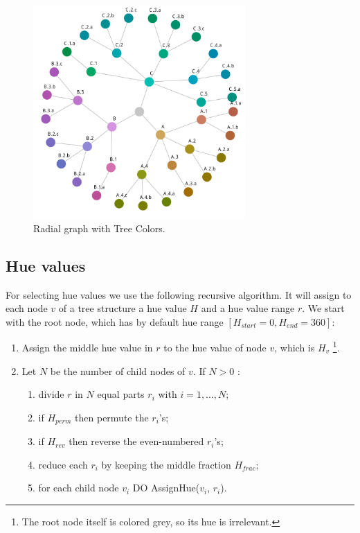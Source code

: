 \documentclass[journal]{vgtc}                %
\begin{document}
\begin{figure}[tb]

  \centering
  \includegraphics[width=3.2in]{HCPgraph.pdf}
  \caption{Radial graph with Tree Colors.}\label{fig:graph}

\end{figure}

\subsection{Hue values}

For selecting hue values we use the following recursive algorithm. It will assign to each node $v$ of a tree structure a hue value $H$ and a hue value range $r$.
We start with the root node, which has by default hue range $[H_{start}=0, H_{end}=360]$:

\begin{enumerate} \itemsep1pt \parskip0pt 
\item Assign the middle hue value in $r$ to the hue value of node $v$, which is $H_v$ \footnote{The root node itself is colored grey, so its hue is irrelevant.}.
\item Let $N$ be the number of child nodes of $v$. If $N>0$ :
\begin{enumerate}[i] \itemsep1pt \parskip0pt 
\item divide $r$ in $N$ equal parts $r_i$ with $i=1,\ldots,N$;
\item if $H_{perm}$ then permute the $r_i$'s;
\item if $H_{rev}$ then reverse the even-numbered $r_i$'s;
\item reduce each $r_i$ by keeping the middle fraction $H_{frac}$;
\item for each child node $v_i$ DO AssignHue($v_i$, $r_i$).
\end{enumerate}
\end{enumerate}
\end{document}
